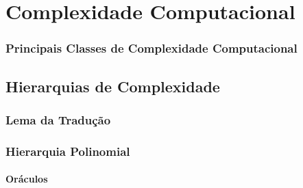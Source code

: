 \chapter{Complexidade Computacional}

\newcommand{\PhiDT}{{\mathcal{T}}} %
\newcommand{\PhiDS}{{\mathcal{S}}} %
\newcommand{\PhiNT}{{\mathcal{N\!T}}} %
\newcommand{\PhiNS}{{\mathcal{N\!S}}} %








\subsection{Principais Classes de Complexidade Computacional}
\label{classes_complexidade}

\section{Hierarquias de Complexidade}
\label{hierarquia_complexidade}

\subsection{Lema da Tradução}

\subsection{Hierarquia Polinomial}

\subsubsection{Oráculos}

